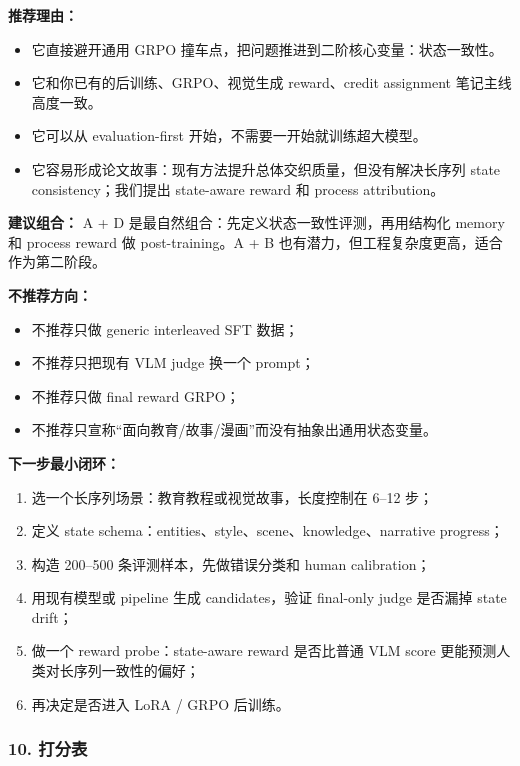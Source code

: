 \textbf{推荐理由：}

\begin{itemize}[leftmargin=1.5em]
  \item 它直接避开通用 GRPO 撞车点，把问题推进到二阶核心变量：状态一致性。
  \item 它和你已有的后训练、GRPO、视觉生成 reward、credit assignment 笔记主线高度一致。
  \item 它可以从 evaluation-first 开始，不需要一开始就训练超大模型。
  \item 它容易形成论文故事：现有方法提升总体交织质量，但没有解决长序列 state consistency；我们提出 state-aware reward 和 process attribution。
\end{itemize}

\textbf{建议组合：} A + D 是最自然组合：先定义状态一致性评测，再用结构化 memory 和 process reward 做 post-training。A + B 也有潜力，但工程复杂度更高，适合作为第二阶段。

\textbf{不推荐方向：}

\begin{itemize}[leftmargin=1.5em]
  \item 不推荐只做 generic interleaved SFT 数据；
  \item 不推荐只把现有 VLM judge 换一个 prompt；
  \item 不推荐只做 final reward GRPO；
  \item 不推荐只宣称“面向教育/故事/漫画”而没有抽象出通用状态变量。
\end{itemize}

\textbf{下一步最小闭环：}

\begin{enumerate}[leftmargin=1.8em]
  \item 选一个长序列场景：教育教程或视觉故事，长度控制在 6--12 步；
  \item 定义 state schema：entities、style、scene、knowledge、narrative progress；
  \item 构造 200--500 条评测样本，先做错误分类和 human calibration；
  \item 用现有模型或 pipeline 生成 candidates，验证 final-only judge 是否漏掉 state drift；
  \item 做一个 reward probe：state-aware reward 是否比普通 VLM score 更能预测人类对长序列一致性的偏好；
  \item 再决定是否进入 LoRA / GRPO 后训练。
\end{enumerate}

\subsubsection*{10. 打分表}

